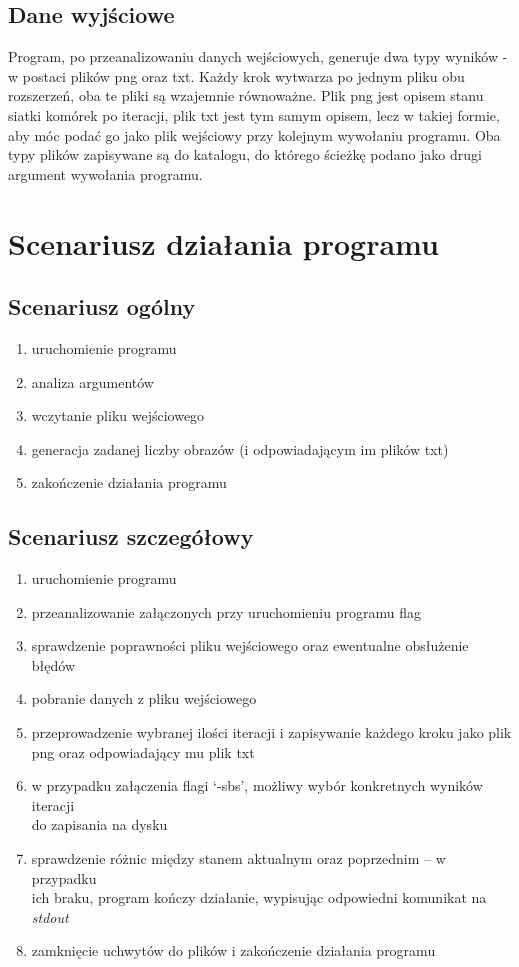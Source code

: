\documentclass{article}
\begin{document}
\subsection{Dane wyjściowe}
Program, po przeanalizowaniu danych wejściowych, generuje dwa typy
wyników - w postaci plików png oraz txt. Każdy krok wytwarza po jednym
pliku obu rozszerzeń, oba te pliki są wzajemnie równoważne. Plik png
jest opisem stanu siatki komórek po iteracji, plik txt jest tym samym
opisem, lecz w takiej formie, aby móc podać go jako plik wejściowy przy
kolejnym wywołaniu programu.
Oba typy plików zapisywane są do katalogu, do którego ścieżkę podano
jako drugi argument wywołania programu.

\section{Scenariusz działania programu}
\subsection{Scenariusz ogólny}
\begin{enumerate}
  \item uruchomienie programu
  \item analiza argumentów
  \item wczytanie pliku wejściowego
  \item generacja zadanej liczby obrazów (i odpowiadającym im plików txt)
  \item zakończenie działania programu
\end{enumerate}

\subsection{Scenariusz szczegółowy}
\begin{enumerate}
  \item uruchomienie programu
  \item przeanalizowanie załączonych przy uruchomieniu programu flag
  \item sprawdzenie poprawności pliku wejściowego oraz ewentualne obsłużenie błędów
  \item pobranie danych z pliku wejściowego
  \item przeprowadzenie wybranej ilości iteracji i zapisywanie każdego kroku jako
    plik png oraz odpowiadający mu plik txt
  \item w przypadku załączenia flagi ‘-sbs’, możliwy wybór konkretnych
    wyników iteracji \\do zapisania na dysku
  \item sprawdzenie różnic między stanem aktualnym oraz poprzednim -- w przypadku \\ich
    braku, program kończy działanie, wypisując odpowiedni komunikat na \textit{stdout}
  \item zamknięcie uchwytów do plików i zakończenie działania programu
\end{enumerate}
\end{document}
